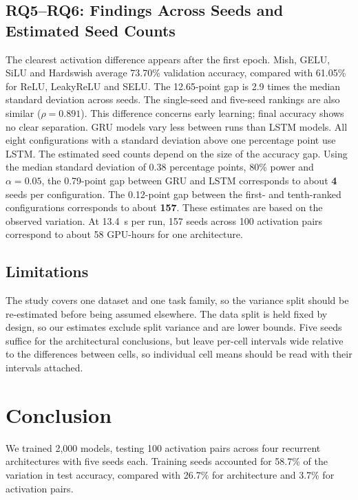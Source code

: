 \documentclass[conference,a4paper]{IEEEtran}
\begin{document}
\subsection{RQ5--RQ6: Findings Across Seeds and Estimated Seed Counts}
\label{sec:rq6}

The clearest activation difference appears after the first epoch.
Mish, GELU, SiLU and Hardswish average 73.70\% validation accuracy,
compared with 61.05\% for ReLU, LeakyReLU and SELU. The 12.65-point
gap is 2.9 times the median standard deviation across seeds.
The single-seed and five-seed rankings are also similar
($\rho=0.891$). This difference concerns early learning; final
accuracy shows no clear separation. GRU models vary less between
runs than LSTM models. All eight configurations with a standard
deviation above one percentage point use LSTM.
The estimated seed counts depend on the size of the accuracy gap.
Using the median standard deviation of 0.38 percentage points,
80\% power and $\alpha=0.05$, the 0.79-point gap between GRU and
LSTM corresponds to about \textbf{4} seeds per configuration.
The 0.12-point gap between the first- and tenth-ranked
configurations corresponds to about \textbf{157}. These estimates
are based on the observed variation. At 13.4~s per run, 157 seeds
across 100 activation pairs correspond to about 58 GPU-hours
for one architecture.

\subsection{Limitations}

The study covers one dataset and one task family, so the variance
split should be re-estimated before being assumed elsewhere. The
data split is held fixed by design, so our estimates exclude split
variance and are lower bounds. Five seeds suffice for the
architectural conclusions, but leave per-cell intervals wide
relative to the differences between cells, so individual cell means
should be read with their intervals attached.

\section{Conclusion}

We trained 2{,}000 models, testing 100 activation pairs across
four recurrent architectures with five seeds each. Training
seeds accounted for 58.7\% of the variation in test accuracy,
compared with 26.7\% for architecture and 3.7\% for activation
pairs.
\end{document}
